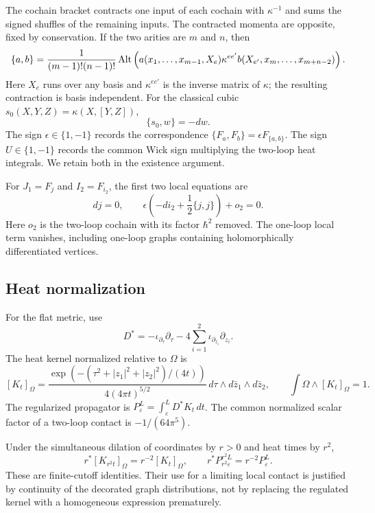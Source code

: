 The cochain bracket contracts one input of each cochain with
$\kappa^{-1}$ and sums the signed shuffles of the remaining
inputs. The contracted momenta are opposite, fixed by
conservation. If the two arities are $m$ and $n$, then
\begin{equation}\label{eq:cochain-bracket}
 \{a,b\}
 =\frac1{(m-1)!(n-1)!}
  \operatorname{Alt}\left(
    a(x_1,\ldots,x_{m-1},X_e)
    \kappa^{ee'}
    b(X_{e'},x_m,\ldots,x_{m+n-2})
  \right).
\end{equation}
Here $X_e$ runs over any basis and $\kappa^{ee'}$ is the inverse
matrix of $\kappa$; the resulting contraction is basis independent.
For the classical cubic $s_0(X,Y,Z)=\kappa(X,[Y,Z])$,
\[
 \{s_0,w\}=-dw.
\]
The sign $\epsilon\in\{1,-1\}$ records the correspondence
$\{F_a,F_b\}=\epsilon F_{\{a,b\}}$. The sign $U\in\{1,-1\}$
records the common Wick sign multiplying the two-loop heat
integrals. We retain both in the existence argument.

For $J_1=F_j$ and $I_2=F_{i_2}$, the first two local equations are
\begin{equation}\label{eq:first-two-equations}
 dj=0,\qquad
 \epsilon\left(-d i_2+\frac12\{j,j\}\right)+o_2=0.
\end{equation}
Here $o_2$ is the two-loop cochain with its factor $\hbar^2$
removed. The one-loop local term vanishes, including one-loop
graphs containing holomorphically differentiated vertices.

\subsection{Heat normalization}

For the flat metric, use
\[
 D^*=-\iota_{\partial_\tau}\partial_\tau
      -4\sum_{i=1}^2\iota_{\partial_{\bar z_i}}\partial_{z_i}.
\]
The heat kernel normalized relative to $\Omega$ is
\begin{equation}\label{eq:heat}
 [K_t]_\Omega=
 \frac{\exp(-(\tau^2+|z_1|^2+|z_2|^2)/(4t))}
      {4(4\pi t)^{5/2}}\,
 d\tau\wedge d\bar z_1\wedge d\bar z_2,
 \qquad \int\Omega\wedge[K_t]_\Omega=1.
\end{equation}
The regularized propagator is
$P_\varepsilon^L=\int_\varepsilon^L D^*K_t\,dt$.
The common normalized scalar factor of a two-loop contact is
$-1/(64\pi^5)$.

Under the simultaneous dilation of coordinates by $r>0$ and
heat times by $r^2$,
\[
 r^*[K_{r^2t}]_\Omega=r^{-2}[K_t]_\Omega,\qquad
 r^*P_{r^2\varepsilon}^{r^2L}
 =r^{-2}P_\varepsilon^L.
\]
These are finite-cutoff identities. Their use for a limiting
local contact is justified by continuity of the decorated
graph distributions, not by replacing the regulated kernel
with a homogeneous expression prematurely.

